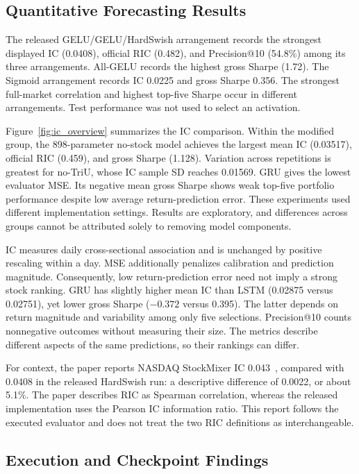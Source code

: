 \documentclass[conference]{IEEEtran}
\begin{document}
\subsection{Quantitative Forecasting Results}
The released GELU/GELU/HardSwish arrangement records the strongest displayed IC (0.0408), official RIC (0.482), and Precision@10 (54.8\%) among its three arrangements. All-GELU records the highest gross Sharpe (1.72). The Sigmoid arrangement records IC 0.0225 and gross Sharpe 0.356. The strongest full-market correlation and highest top-five Sharpe occur in different arrangements. Test performance was not used to select an activation.

Figure~\ref{fig:ic_overview} summarizes the IC comparison. Within the modified group, the 898-parameter no-stock model achieves the largest mean IC (0.03517), official RIC (0.459), and gross Sharpe (1.128). Variation across repetitions is greatest for no-TriU, whose IC sample SD reaches 0.01569. GRU gives the lowest evaluator MSE. Its negative mean gross Sharpe shows weak top-five portfolio performance despite low average return-prediction error. These experiments used different implementation settings. Results are exploratory, and differences across groups cannot be attributed solely to removing model components.

IC measures daily cross-sectional association and is unchanged by positive rescaling within a day. MSE additionally penalizes calibration and prediction magnitude. Consequently, low return-prediction error need not imply a strong stock ranking. GRU has slightly higher mean IC than LSTM (0.02875 versus 0.02751), yet lower gross Sharpe ($-0.372$ versus 0.395). The latter depends on return magnitude and variability among only five selections. Precision@10 counts nonnegative outcomes without measuring their size. The metrics describe different aspects of the same predictions, so their rankings can differ.

For context, the paper reports NASDAQ StockMixer IC 0.043~\cite{stockmixer}, compared with 0.0408 in the released HardSwish run: a descriptive difference of 0.0022, or about 5.1\%. The paper describes RIC as Spearman correlation, whereas the released implementation uses the Pearson IC information ratio. This report follows the executed evaluator and does not treat the two RIC definitions as interchangeable.

\subsection{Execution and Checkpoint Findings}
\end{document}
